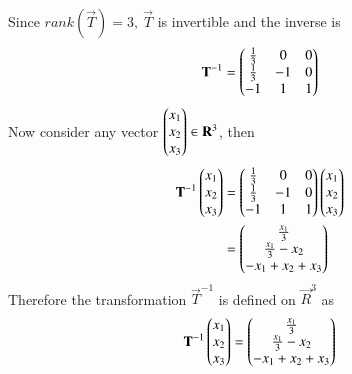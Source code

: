 \documentclass[journal,12pt,twocolumn]{IEEEtran}
\begin{document}
Since $rank(\vec{T})=3, \ \vec{T}$ is invertible and the inverse is
\begin{align}
	\mathbf{T}^{-1}=\begin{pmatrix}\frac{1}{3}&0&0\\ 
                            \frac{1}{3}&-1&0\\
                            -1&1&1\end{pmatrix}
\end{align}
Now consider any vector $\begin{pmatrix}x_1\\x_2\\x_3\end{pmatrix} \in \mathbf{R}^3$, then
\begin{align}
	\mathbf{T}^{-1}\begin{pmatrix}x_1\\x_2\\x_3\end{pmatrix}&=\begin{pmatrix}\frac{1}{3}&0&0\\
                            \frac{1}{3}&-1&0\\
                            -1&1&1\end{pmatrix}\begin{pmatrix}x_1\\x_2\\x_3\end{pmatrix}\\
			    &=\begin{pmatrix}\frac{x_1}{3}\\\frac{x_1}{3}-x_2\\-x_1+x_2+x_3\end{pmatrix}
\end{align}
Therefore the transformation $\vec{T}^{-1}$ is defined on $\vec{R}^3 $ as
\begin{align}
\mathbf{T}^{-1}\begin{pmatrix}x_1\\x_2\\x_3\end{pmatrix}=\begin{pmatrix}\frac{x_1}{3}\\\frac{x_1}{3}-x_2\\-x_1+x_2+x_3\end{pmatrix}
\end{align}
\end{document}
